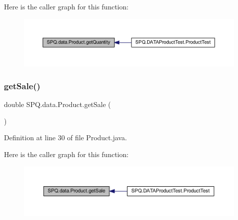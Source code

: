 Here is the caller graph for this function\+:
\nopagebreak
\begin{figure}[H]
\begin{center}
\leavevmode
\includegraphics[width=350pt]{class_s_p_q_1_1data_1_1_product_a1bcbc2a00b31563677cea1ab4cb8095c_icgraph}
\end{center}
\end{figure}
\mbox{\label{class_s_p_q_1_1data_1_1_product_a07ba2dea61bb96215609776cc4d7058d}} 
\subsubsection{\texorpdfstring{get\+Sale()}{getSale()}\hspace{0.1cm}{\footnotesize\ttfamily [1/2]}}
{\footnotesize\ttfamily double S\+P\+Q.\+data.\+Product.\+get\+Sale (\begin{DoxyParamCaption}{ }\end{DoxyParamCaption})}



Definition at line 30 of file Product.\+java.

Here is the caller graph for this function\+:
\nopagebreak
\begin{figure}[H]
\begin{center}
\leavevmode
\includegraphics[width=350pt]{class_s_p_q_1_1data_1_1_product_a07ba2dea61bb96215609776cc4d7058d_icgraph}
\end{center}
\end{figure}
\mbox{\label{class_s_p_q_1_1data_1_1_product_a07ba2dea61bb96215609776cc4d7058d}} 
